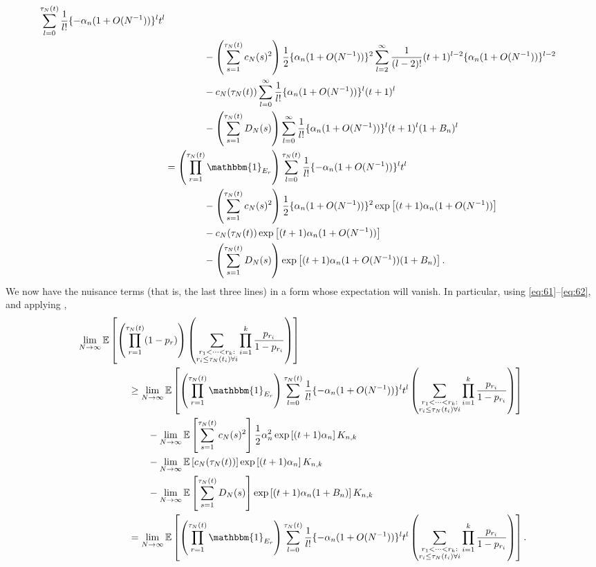 \documentclass{article}
\newcommand{\E}{\mathbb{E}}
\newcommand{\1}[1]{\mathbbm{1}_{#1}}
\begin{document}
\begin{align}
\sum_{l=0}^{\tau_N(t)} \frac{1}{l!} \{ -\alpha_n(1+O(N^{-1}))\}^l t^l \notag\\
&\qquad\qquad-  \left(\sum_{s=1}^{\tau_N(t)} c_N(s)^2 \right)
\frac{1}{2} \{ \alpha_n (1+O(N^{-1})) \}^2  \sum_{l=2}^\infty \frac{1}{(l-2)!} (t+1)^{l-2} \{ \alpha_n (1+O(N^{-1})) \}^{l-2} \notag\\
&\qquad\qquad- c_N(\tau_N(t)) \sum_{l=0}^\infty \frac{1}{l!} \{\alpha_n(1+O(N^{-1}))\}^l (t+1)^l \notag\\
&\qquad\qquad- \left(\sum_{s=1}^{\tau_N(t)} D_N(s) \right)
\sum_{l=0}^\infty \frac{1}{l!} \{\alpha_n(1+O(N^{-1}))\}^l (t+1)^l (1+B_n)^l \notag\\
&= \left( \prod_{r=1}^{\tau_N(t)} \1{E_r} \right)
\sum_{l=0}^{\tau_N(t)} \frac{1}{l!} \{ -\alpha_n(1+O(N^{-1}))\}^l t^l \notag\\
&\qquad\qquad-  \left(\sum_{s=1}^{\tau_N(t)} c_N(s)^2 \right)
\frac{1}{2} \{ \alpha_n (1+O(N^{-1})) \}^2
\exp \left[ (t+1) \alpha_n (1+O(N^{-1})) \right] \notag\\
&\qquad\qquad- c_N(\tau_N(t)) \exp \left[ (t+1) \alpha_n (1+O(N^{-1})) \right] \notag\\
&\qquad\qquad- \left(\sum_{s=1}^{\tau_N(t)} D_N(s) \right)
\exp \left[ (t+1) \alpha_n (1+O(N^{-1})) (1+B_n) \right] .
\end{align}
We now have the nuisance terms (that is, the last three lines) in a form whose expectation will vanish.
In particular, using \eqref{eq:61}--\eqref{eq:62}, and applying \citet[Equations (3)--(5)]{brown2020},
\begin{align}
\lim_{N\to\infty} \E &\left[ \left( \prod_{r=1}^{\tau_N(t)} (1-p_r) \right) \left( \sum_{\substack{r_1<\dots<r_k :\\ r_i\leq \tau_N(t_i) \forall i}} \prod_{i=1}^k \frac{p_{r_i}}{1-p_{r_i}} \right) \right] \notag\\
&\qquad\geq \lim_{N\to\infty} \E \left[ \left( \prod_{r=1}^{\tau_N(t)} \1{E_r} \right)
\sum_{l=0}^{\tau_N(t)} \frac{1}{l!} \{ -\alpha_n(1+O(N^{-1}))\}^l t^l
\left( \sum_{\substack{r_1<\dots<r_k :\\ r_i\leq \tau_N(t_i) \forall i}} \prod_{i=1}^k \frac{p_{r_i}}{1-p_{r_i}} \right) \right] \notag\\
&\qquad\qquad- \lim_{N\to\infty} \E\left[ \sum_{s=1}^{\tau_N(t)} c_N(s)^2 \right]
\frac{1}{2} \alpha_n^2
\exp \left[ (t+1) \alpha_n \right] K_{n,k} \notag\\
&\qquad\qquad- \lim_{N\to\infty} \E\left[ c_N(\tau_N(t)) \right]
 \exp \left[ (t+1) \alpha_n \right] K_{n,k} \notag\\
 &\qquad\qquad- \lim_{N\to\infty} \E\left[ \sum_{s=1}^{\tau_N(t)} D_N(s) \right]
\exp \left[ (t+1) \alpha_n (1+B_n) \right] K_{n,k} \notag\\
&\qquad= \lim_{N\to\infty} \E \left[ \left( \prod_{r=1}^{\tau_N(t)} \1{E_r} \right)
\sum_{l=0}^{\tau_N(t)} \frac{1}{l!} \{ -\alpha_n(1+O(N^{-1}))\}^l t^l
\left( \sum_{\substack{r_1<\dots<r_k :\\ r_i\leq \tau_N(t_i) \forall i}} \prod_{i=1}^k \frac{p_{r_i}}{1-p_{r_i}} \right) \right] .
\end{align}
\end{document}
